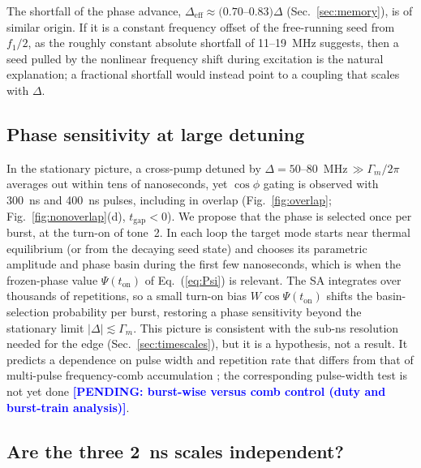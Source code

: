 \documentclass[aps,prb,reprint,superscriptaddress,floatfix]{revtex4-2}
\newcommand{\pend}[1]{\textcolor{blue}{\textbf{[PENDING: #1]}}}
\newcommand{\pend}[1]{}
\newcommand{\tgap}{t_{\mathrm{gap}}}
\newcommand{\Deff}{\Delta_{\mathrm{eff}}}
\begin{document}
The shortfall of the phase advance, $\Deff\approx(0.70$--$0.83)\Delta$ (Sec.~\ref{sec:memory}), is of similar origin. If it is a constant frequency offset of the free-running seed from $f_1/2$, as the roughly constant absolute shortfall of 11--\SI{19}{\mega\hertz} suggests, then a seed pulled by the nonlinear frequency shift during excitation \cite{massouras24} is the natural explanation; a fractional shortfall would instead point to a coupling that scales with $\Delta$.

\subsection{Phase sensitivity at large detuning}\label{sec:disc-burst}

In the stationary picture, a cross-pump detuned by $\Delta=50$--\SI{80}{\mega\hertz}\,$\gg\Gamma_m/2\pi$ averages out within tens of nanoseconds, yet $\cos\phi$ gating is observed with \SI{300}{\nano\second} and \SI{400}{\nano\second} pulses, including in overlap (Fig.~\ref{fig:overlap}; Fig.~\ref{fig:nonoverlap}(d), $\tgap<0$). We propose that the phase is selected once per burst, at the turn-on of tone~2. In each loop the target mode starts near thermal equilibrium (or from the decaying seed state) and chooses its parametric amplitude and phase basin \cite{elyasi22,zautkin83,brown63} during the first few nanoseconds, which is when the frozen-phase value $\Psi(t_{\mathrm{on}})$ of Eq.~(\ref{eq:Psi}) is relevant. The SA integrates over thousands of repetitions, so a small turn-on bias $W\cos\Psi(t_{\mathrm{on}})$ shifts the basin-selection probability per burst, restoring a phase sensitivity beyond the stationary limit $|\Delta|\lesssim\Gamma_m$. This picture is consistent with the sub-ns resolution needed for the edge (Sec.~\ref{sec:timescales}), but it is a hypothesis, not a result. It predicts a dependence on pulse width and repetition rate that differs from that of multi-pulse frequency-comb accumulation \cite{hula22,dreyer22,li26}; the corresponding pulse-width test is not yet done \pend{burst-wise versus comb control (duty and burst-train analysis)}.

\subsection{Are the three \SI{2}{\nano\second} scales independent?}\label{sec:disc-scales}
\end{document}
